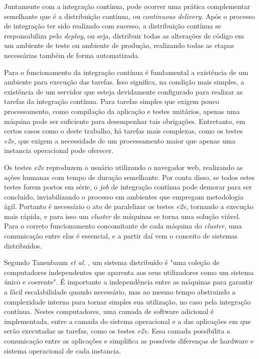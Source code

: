 Juntamente com a integração contínua, pode ocorrer uma prática complementar semelhante que é a distribuição contínua, ou \emph{continuous delivery}. Após o processo de integração ter sido realizado com sucesso, a distribuição contínua se responsabiliza pelo \emph{deploy}, ou seja, distribuir todas as alterações de código em um ambiente de teste ou ambiente de produção, realizando todas as etapas necessárias também de forma automatizada.

Para o funcionamento da integração contínua é fundamental a existência de um ambiente para execução das tarefas. Isso significa, na condição mais simples, a existência de um servidor que esteja devidamente configurado para realizar as tarefas da integração contínua. Para tarefas simples que exigem pouco processamento, como compilação da aplicação e testes unitários, apenas uma máquina pode ser suficiente para desempenhar tais obrigações. Entretanto, em certos casos como o deste trabalho, há tarefas mais complexas, como os testes \emph{e2e}, que exigem a necessidade de um processamento maior que apenas uma instancia operacional
pode oferecer.

Os testes \emph{e2e} reproduzem o usuário utilizando o navegador web, realizando as ações humanas com tempo de duração semelhante. Por conta disso, se todos estes testes forem postos em série, o \emph{job} de integração contínua pode demorar para ser concluído, inviabilizando o processo em ambientes que empregam metodologia ágil. Portanto é necessário o ato de paralelizar os testes \emph{e2e}, tornando a execução mais rápida, e para isso um \emph{cluster} de máquinas se torna uma solução viável. Para o correto funcionamento concomitante de cada máquina do \emph{cluster}, uma comunicação entre elas é essencial, e a partir daí vem o conceito de sistemas distribuídos.

Segundo Tanenbaum \emph{et al.} \cite{tanenbaum}, um sistema distribuído é "uma coleção de computadores independentes que aparenta aos seus utilizadores como um sistema único e coerente". É importante a independência entre as máquinas para garantir a fácil escalabilidade quando necessário, mas ao mesmo tempo abstraindo a complexidade interna para tornar simples sua utilização, no caso pela integração contínua. Nestes computadores, uma camada de software adicional é implementada, entre a camada do sistema operacional e a das aplicações em que serão executadas as tarefas, como os testes \emph{e2e}. Essa camada possibilita a comunicação entre as aplicações e simplifica as possíveis diferenças de hardware e sistema operacional de cada instancia.

